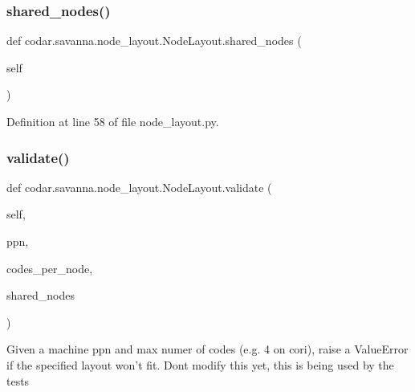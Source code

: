 \mbox{\label{classcodar_1_1savanna_1_1node__layout_1_1_node_layout_a90f88aa1b664e9e9ed2b69e898c4581a}} 
\subsubsection{\texorpdfstring{shared\+\_\+nodes()}{shared\_nodes()}}
{\footnotesize\ttfamily def codar.\+savanna.\+node\+\_\+layout.\+Node\+Layout.\+shared\+\_\+nodes (\begin{DoxyParamCaption}\item[{}]{self }\end{DoxyParamCaption})}



Definition at line 58 of file node\+\_\+layout.\+py.

\mbox{\label{classcodar_1_1savanna_1_1node__layout_1_1_node_layout_a9b1ef6ea6e08f60a04891db7ee460990}} 
\subsubsection{\texorpdfstring{validate()}{validate()}}
{\footnotesize\ttfamily def codar.\+savanna.\+node\+\_\+layout.\+Node\+Layout.\+validate (\begin{DoxyParamCaption}\item[{}]{self,  }\item[{}]{ppn,  }\item[{}]{codes\+\_\+per\+\_\+node,  }\item[{}]{shared\+\_\+nodes }\end{DoxyParamCaption})}

\begin{DoxyVerb}Given a machine ppn and max numer of codes (e.g. 4 on cori),
raise a ValueError if the specified layout won't fit.
Dont modify this yet, this is being used by the tests\end{DoxyVerb}
 


